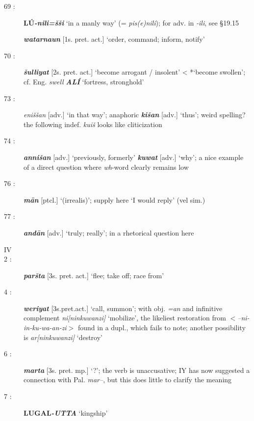 \documentclass[10pt]{article}
\newcommand{\bit}[1]{\textbf{\textit{#1}}}				%
\newcommand{\p}[1]{{\tiny[{#1}]}}					%
\newcommand{\hith}{\textsubwedge{h}}
\newcommand{\Hith}{\textsubwedge{H}}
\renewcommand{\.}[1]{\textsubdot{#1}}
\begin{document}
\begin{description}
\item[69 :] \textbf{L\'U}\bit{-nili=\v{s}\v{s}i} `in a manly way' (= \textit{pis(e)nili}); for adv. in \textit{-ili}, see  \S19.15  

\bit{watarna{\hith\hith}un} \p{1s. pret. act.} `order, command; inform, notify'

\item[70 :] \bit{\v{s}ulliyat} \p{2s. pret. act.} `become arrogant / insolent' < {*}`become swollen'; cf. Eng. \textit{swell} \bit{{\Hith}AL\'I} `fortress, stronghold' 

\item[73 :] \textit{eni\v{s}\v{s}an} \p{adv.} `in that way'; anaphoric \bit{ki\v{s}an} \p{adv.} `thus'; weird spelling? the following indef. \textit{kui\v{s}} looks like cliticization

\item[74 :] \bit{anni\v{s}an} \p{adv.} `previously, formerly' \bit{kuwat} \p{adv.} `why'; a nice example of a direct question where \textit{wh}-word clearly remains low 

\item[76 :] \bit{m\=an} \p{ptcl.} `(irrealis)'; supply here `I would reply' (vel sim.)

\item[77 :] \bit{{\hith}and\=an} \p{adv.} `truly; really'; in a rhetorical question here

\smallskip
\item[IV]
\smallskip

\item[2 :] \bit{par\v{s}ta} \p{3s. pret. act.} `flee; take off; race from'

\item[4 :] \bit{weriyat} \p{3s.pret.act.} `call, summon'; with obj. \textit{=an} and infinitive complement \textit{ni[ninkuwanzi]} `mobilize', the likeliest restoration from $<$\textit{--ni-in-ku-wa-an-zi}$>$ found in a dupl., which \citet[22]{otten1981hattusili} fails to note; another possibility is \textit{{\hith}ar[ninkuwanzi]} `destroy'

\item[6 :] \bit{mar{\hith}ta} \p{3s. pret. mp.} `?'; the verb is unaccusative; IY has now suggested a connection with Pal. \textit{mar{\hith}--}, but this does little to clarify the meaning

\item[7 :] \textbf{LUGAL}\bit{-UTTA} `kingship' %


\end{description}
\end{document}
